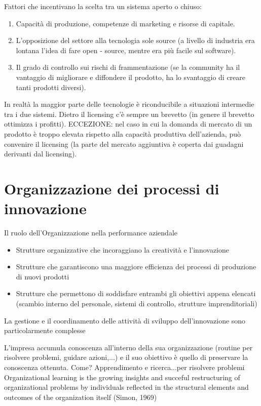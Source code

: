 \documentclass{article}
\begin{document}
Fattori che incentivano la scelta tra un sistema aperto o chiuso:
\begin{enumerate}
\item  Capacità di produzione, competenze di marketing e risorse di capitale.
\item  L’opposizione del settore alla tecnologia sole source (a livello di industria era lontana l’idea
di fare open - source, mentre era più facile sul software).
\item Il grado di controllo sui rischi di frammentazione (se la community ha il vantaggio di
migliorare e diffondere il prodotto, ha lo svantaggio di creare tanti prodotti diversi).
\end{enumerate}


In realtà la maggior parte delle tecnologie è riconducibile a situazioni intermedie tra i due sistemi.
Dietro il licensing c’è sempre un brevetto (in genere il brevetto ottimizza i profitti).
ECCEZIONE: nel caso in cui la domanda di mercato di un prodotto è troppo elevata rispetto alla
capacità produttiva dell’azienda, può convenire il licensing (la parte del mercato aggiuntiva è
coperta dai guadagni derivanti dal licensing).

\section{Organizzazione dei processi di innovazione}
Il ruolo dell'Organizzazione nella performance aziendale
\begin{itemize}
\item Strutture organizzative che incoraggiano la creatività e l’innovazione
\item Strutture che garantiscono una maggiore efficienza dei processi di
produzione di nuovi prodotti
\item Strutture che permettono di soddisfare entrambi gli obiettivi appena
elencati (scambio interno del personale, sistemi di controllo, strutture
imprenditoriali)
\end{itemize}

La gestione e il coordinamento delle attività di sviluppo
dell’innovazione sono particolarmente complesse

L’impresa accumula conoscenza all’interno della sua organizzazione
(routine per risolvere problemi, guidare azioni,...) e il suo obiettivo è
quello di preservare la conoscenza ottenuta.
Come?
Apprendimento e ricerca...per risolvere problemi
Organizational learning is the growing insights and succeful
restructuring of organizational problems by individuals reflected in
the structural elements and outcomes of the organization itself
(Simon, 1969)
\end{document}
